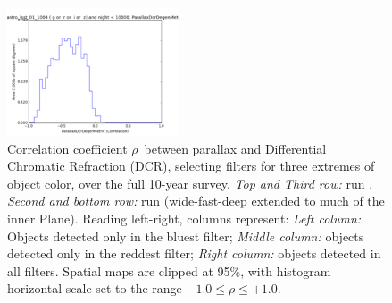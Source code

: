 \begin{figure}[ht]
\begin{center}
  \includegraphics[width=2.0in]{./figs/milkyway/astromPanels/MW_Astrom_paDcrDegen_wfdPlane_10y_hst.png}
  \end{center}
  \caption{Correlation coefficient $\rho$~between parallax and Differential Chromatic Refraction (DCR), selecting filters for three extremes of object color, over the full 10-year survey. {\it Top and Third row:} \OpSim run . {\it Second and bottom row:} \OpSim run  (wide-fast-deep extended to much of the inner Plane). Reading left-right, columns represent: {\it Left column:} Objects detected only in the bluest filter; {\it Middle column:} objects detected only in the reddest filter; {\it Right column:} objects detected in all filters. Spatial maps are clipped at 95\%, with histogram horizontal scale set to the range $-1.0 \le \rho \le +1.0$.}
  \label{fig_astrom_ByFilter_PADegen}
\end{figure}

